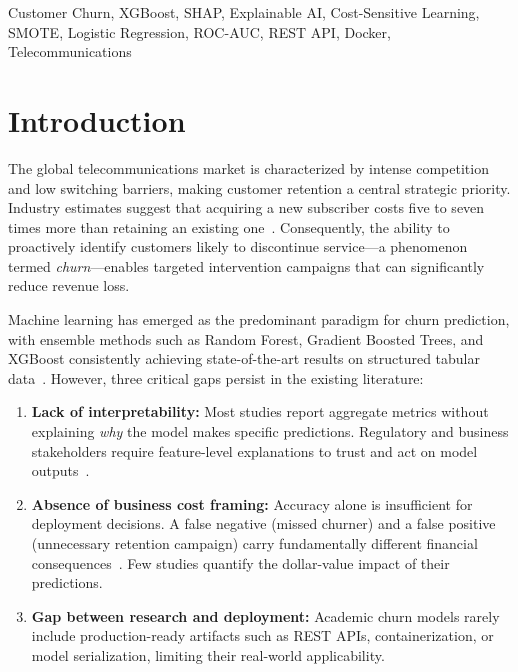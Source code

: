 \documentclass[10pt, conference, letterpaper]{IEEEtran}
\begin{document}
\begin{IEEEkeywords}
Customer Churn, XGBoost, SHAP, Explainable AI, Cost-Sensitive Learning, SMOTE, Logistic Regression, ROC-AUC, REST API, Docker, Telecommunications
\end{IEEEkeywords}

\section{Introduction}
\label{sec:introduction}

The global telecommunications market is characterized by intense competition and low switching barriers, making customer retention a central strategic priority. Industry estimates suggest that acquiring a new subscriber costs five to seven times more than retaining an existing one~\cite{ahmad2019churn}. Consequently, the ability to proactively identify customers likely to discontinue service---a phenomenon termed \textit{churn}---enables targeted intervention campaigns that can significantly reduce revenue loss.

Machine learning has emerged as the predominant paradigm for churn prediction, with ensemble methods such as Random Forest, Gradient Boosted Trees, and XGBoost consistently achieving state-of-the-art results on structured tabular data~\cite{vafeiadis2015comparison, lalwani2022churn}. However, three critical gaps persist in the existing literature:

\begin{enumerate}
    \item \textbf{Lack of interpretability:} Most studies report aggregate metrics without explaining \textit{why} the model makes specific predictions. Regulatory and business stakeholders require feature-level explanations to trust and act on model outputs~\cite{lundberg2017shap}.
    \item \textbf{Absence of business cost framing:} Accuracy alone is insufficient for deployment decisions. A false negative (missed churner) and a false positive (unnecessary retention campaign) carry fundamentally different financial consequences~\cite{elkan2001cost}. Few studies quantify the dollar-value impact of their predictions.
    \item \textbf{Gap between research and deployment:} Academic churn models rarely include production-ready artifacts such as REST APIs, containerization, or model serialization, limiting their real-world applicability.
\end{enumerate}
\end{document}
